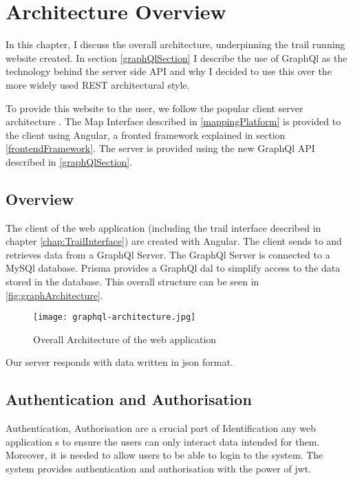 \chapter{Architecture Overview} \label{chap:Architecture}
In this chapter, I discuss the overall architecture, underpinning the trail running website created. In section \ref{graphQlSection} I describe the use of GraphQl as the technology behind the server side API and why I decided to use this over the more widely used REST architectural style.

To provide this website to the user, we follow the popular client server architecture \cite{wiki:ClientServerModel}. The Map Interface described in \ref{mappingPlatform} is provided to the client using Angular, a fronted framework explained in section \ref{frontendFramework}. The server is provided using the new GraphQl API described in \autoref{graphQlSection}.



\section{Overview}
The client of the web application (including the trail interface described in chapter \ref{chap:TrailInterface}) are created with Angular. The client sends to and retrieves data from a GraphQl Server. The GraphQl Server is connected to a MySQl database. Prisma provides a GraphQl \acrfull{dal} to simplify access to the data stored in the database. This overall structure can be seen in \autoref{fig:graphArchitecture}.

\begin{figure}[ht]
    \centering
    \texttt{[image: graphql-architecture.jpg]}
    \caption{Overall Architecture of the web application}
    \label{fig:graphArchitecture}
\end{figure}

Our server responds with data written in \acrfull{json} format.

\section{Authentication and Authorisation}
Authentication, Authorisation  are a crucial part of Identification any web application s to ensure the users can only interact data intended for them. Moreover, it is needed to allow users to be able to login to the system. The system provides authentication and authorisation with the power of \acrfull{jwt}.

